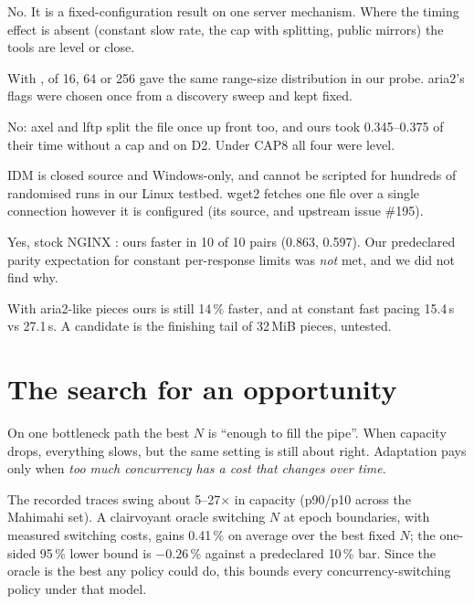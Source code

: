 \A No. It is a fixed-configuration result on one server mechanism. Where the timing effect is absent (constant slow rate, the cap with splitting, public mirrors) the tools are level or close.

\A With ,  of 16, 64 or 256 gave the same range-size distribution in our probe. aria2's flags were chosen once from a discovery sweep and kept fixed.

\A No: axel and lftp split the file once up front too, and ours took 0.345--0.375 of their time without a cap and on D2. Under CAP8 all four were level.

\A IDM is closed source and Windows-only, and cannot be scripted for hundreds of randomised runs in our Linux testbed. wget2 fetches one file over a single connection however it is configured (its source, and upstream issue \#195).

\A Yes, stock NGINX : ours faster in 10 of 10 pairs (0.863, 0.597). Our predeclared parity expectation for constant per-response limits was \emph{not} met, and we did not find why.

\A With aria2-like pieces ours is still 14\,\% faster, and at constant fast pacing 15.4\,s vs 27.1\,s. A candidate is the finishing tail of 32\,MiB pieces, untested.

\section{The search for an opportunity}
\A On one bottleneck path the best $N$ is ``enough to fill the pipe''. When capacity drops, everything slows, but the same setting is still about right. Adaptation pays only when \emph{too much concurrency has a cost that changes over time}.

\A The recorded traces swing about 5--27$\times$ in capacity (p90/p10 across the Mahimahi set). A clairvoyant oracle switching $N$ at epoch boundaries, with measured switching costs, gains 0.41\,\% on average over the best fixed $N$; the one-sided 95\,\% lower bound is $-0.26$\,\% against a predeclared 10\,\% bar. Since the oracle is the best any policy could do, this bounds every concurrency-switching policy under that model.

